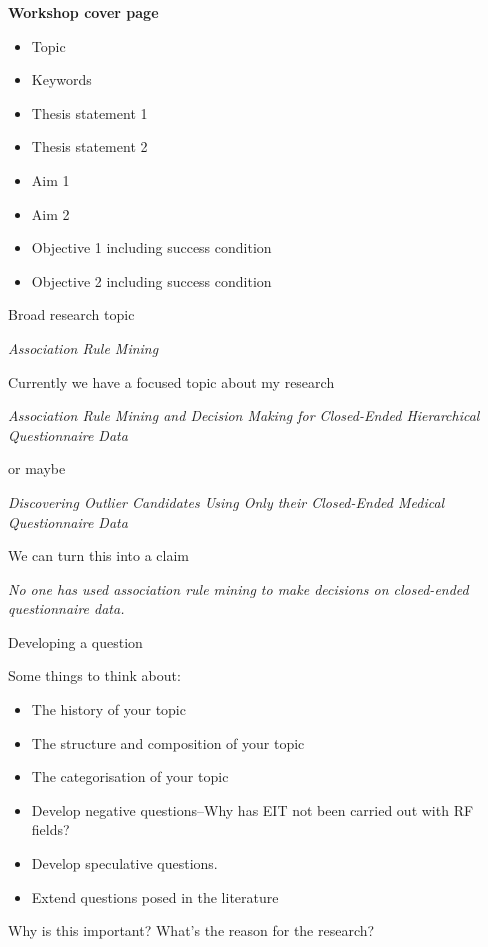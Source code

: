 \documentclass{ruthesis}
\begin{document}
\thispagestyle{empty}

\noindent
\textbf{Workshop cover page}

\begin{itemize}
	\item Topic
	\item Keywords
	\item Thesis statement 1
	\item Thesis statement 2
	\item Aim 1
	\item Aim 2
	\item Objective 1 including success condition
	\item Objective 2 including success condition
	
\end{itemize}

\par
\noindent
Broad research topic

\par
\textit{Association Rule Mining}

\noindent
Currently we have a focused topic about my research

\textit{Association Rule Mining and Decision Making for Closed-Ended Hierarchical Questionnaire Data} 

\noindent
or maybe

\textit{Discovering Outlier Candidates Using Only their Closed-Ended Medical Questionnaire Data}


\noindent
We can turn this into a claim 

\textit{No one has used association rule mining to make decisions on closed-ended questionnaire data.}

\noindent
Developing a question

Some things to think about:

\begin{itemize}
	\item The history of your topic
	\item The structure and composition of your topic
	\item The categorisation of your topic
	\item Develop negative questions–Why has EIT not been carried out with RF fields?
	\item Develop speculative questions.
	\item Extend questions posed in the literature
\end{itemize}


\noindent
Why is this important? What's the reason for the research?
\end{document}
